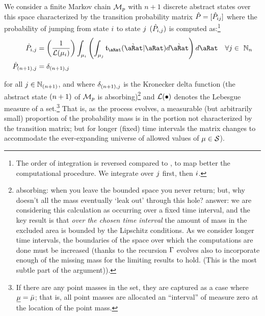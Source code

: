 \documentclass[\econtexRoot/BufferStockTheory.tex]{subfiles}
\begin{document}
We consider a finite Markov chain $\mathcal{M}_{p}$ with $n+1$ discrete abstract states over this space characterized by the transition probability matrix $\hat{P} = [\hat{P}_{ij}]$ where the probability of jumping from state $i$ to state $j$ $(\hat{P}_{i,j})$ is computed as:\footnote{The order of integration is reversed compared to \cite{saDiscrete}, to map better the computational procedure.  We integrate over $j$ first, then $i$.}
\begin{align}
  \TnsMrkv_{\thisBin,\thatBin} &= \left(\frac{1}{\Lebes(\SetPartCnts_{\thisBin})}\right)\int_{\SetPartCnts_{\thisBin}}\left(\int_{\SetPartCnts_{\thatBin}}\DnsPntNxtFmPntNow_{\pnt}(\Nxt{\pnt}|\pnt){d\Nxt{\pnt}}\right){d\pnt}~~~\forall\thatBin \in~ \Nteger_{\NumAprxStes} \label{eq:thisTOthat}
  \\ \TnsMrkv_{\NumAprxStesPls,\thatBin} &= \delta_{\NumAprxStesPls,\thatBin}\notag
\end{align}

\noindent for all $j \in \mathbb{N}_{(n+1)}$, and where $\delta_{(n+1),j}$ is the Kronecker delta function (the abstract state $(n+1)$ of $\mathcal{M}_{p}$ is absorbing)\footnote{absorbing: when you leave the bounded space you never return; but, why doesn't all the mass eventually `leak out' through this hole? answer: we are considering this calculation as occurring over a fixed time interval, and the key result is that \emph{over the chosen time interval} the amount of mass in the excluded area is bounded by the Lipschitz conditions.  As we consider longer time intervals, the boundaries of the space over which the computations are done must be increased (thanks to the recursion $\Gamma$ evolves also to incorporate enough of the missing mass for the limiting results to hold.  (This is the most subtle part of the argument)).}
and $\mathcal{L}(\bullet)$ denotes the Lebesgue measure of a set.\footnote{If there are any point masses in the set, they are captured as a case where $\underline{\mu}=\bar{\mu}$; that is, all point masses are allocated an ``interval'' of measure zero at the location of the point mass.}    That is, as the process evolves, a measurable (but arbitrarily small) proportion of the probability mass is in the portion not characterized by the transition matrix; but for longer (fixed) time intervals the matrix changes to accommodate the ever-expanding universe of allowed values of $\mu \in \mathcal{S}$).
\end{document}
